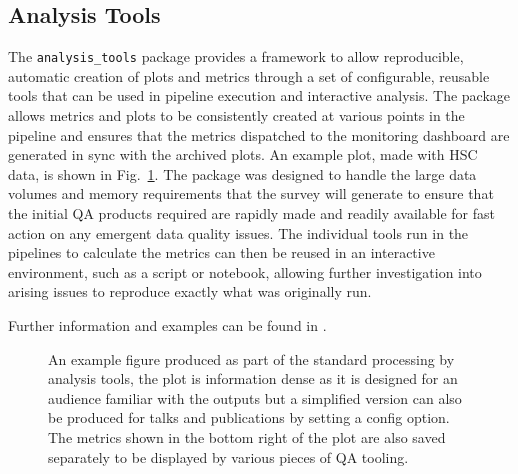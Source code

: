 \subsection{Analysis Tools}

The \texttt{analysis\_tools} package provides a framework to allow reproducible, automatic creation of plots and metrics through a set of configurable, reusable tools that can be used in pipeline execution and interactive analysis.
The package allows metrics and plots to be consistently created at various points in the pipeline and ensures that the metrics dispatched to the monitoring dashboard are generated in sync with the archived plots.
An example plot, made with HSC data, is shown in Fig.~\ref{fig:atools}.
The package was designed to handle the large data volumes and memory requirements that the survey will generate to ensure that the initial QA products required are rapidly made and readily available for fast action on any emergent data quality issues.
The individual tools run in the pipelines to calculate the metrics can then be reused in an interactive environment, such as a script or notebook, allowing further investigation into arising issues to reproduce exactly what was originally run.

Further information and examples can be found in \citet{DMTN-314}.

\begin{figure}[h]
\caption{An example figure produced as part of the standard processing by analysis tools, the plot is information dense as it is designed for an audience familiar with the outputs but a simplified version can also be produced for talks and publications by setting a config option.
The metrics shown in the bottom right of the plot are also saved separately to be displayed by various pieces of QA tooling.}
\label{fig:atools}
\end{figure}
